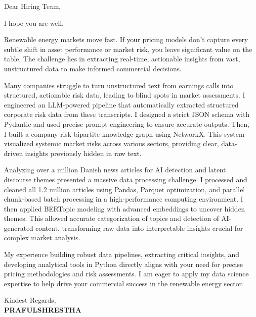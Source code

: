 \documentclass[11pt,a4paper]{article}
\begin{document}
\noindent Dear Hiring Team,

I hope you are well.

Renewable energy markets move fast. If your pricing models don't capture every subtle shift in asset performance or market risk, you leave significant value on the table. The challenge lies in extracting real-time, actionable insights from vast, unstructured data to make informed commercial decisions.

Many companies struggle to turn unstructured text from earnings calls into structured, actionable risk data, leading to blind spots in market assessments. I engineered an LLM-powered pipeline that automatically extracted structured corporate risk data from these transcripts. I designed a strict JSON schema with Pydantic and used precise prompt engineering to ensure accurate outputs. Then, I built a company-risk bipartite knowledge graph using NetworkX. This system visualized systemic market risks across various sectors, providing clear, data-driven insights previously hidden in raw text.

Analyzing over a million Danish news articles for AI detection and latent discourse themes presented a massive data processing challenge. I processed and cleaned all 1.2 million articles using Pandas, Parquet optimization, and parallel chunk-based batch processing in a high-performance computing environment. I then applied BERTopic modeling with advanced embeddings to uncover hidden themes. This allowed accurate categorization of topics and detection of AI-generated content, transforming raw data into interpretable insights crucial for complex market analysis.

My experience building robust data pipelines, extracting critical insights, and developing analytical tools in Python directly aligns with your need for precise pricing methodologies and risk assessments. I am eager to apply my data science expertise to help drive your commercial success in the renewable energy sector.

\vspace{2em}
\noindent Kindest Regards,\\
\textbf{PRAFULSHRESTHA}
\end{document}
